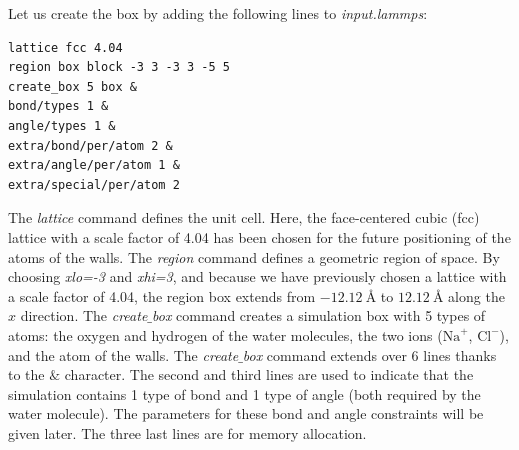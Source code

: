 \documentclass[9pt,tutorial]{livecoms}
\begin{document}
Let us create the box by adding the following lines to \textit{input.lammps}:
{\normalsize \begin{verbatim}
lattice fcc 4.04
region box block -3 3 -3 3 -5 5
create_box 5 box &
bond/types 1 &
angle/types 1 &
extra/bond/per/atom 2 &
extra/angle/per/atom 1 &
extra/special/per/atom 2
\end{verbatim}}
The \textit{lattice} command defines the unit cell. Here, the face-centered cubic (fcc) lattice with a scale factor of
4.04 has been chosen for the future positioning of the atoms of the walls. The \textit{region} command defines a geometric
region of space. By choosing \textit{xlo=-3} and \textit{xhi=3}, and because we have previously chosen a lattice with a scale
factor of 4.04, the region box extends from $-12.12~\text{\AA{}}$ to $12.12~\text{\AA{}}$ along the $x$ direction. The \textit{create$\_$box} command creates a simulation box with 5 types of atoms: the oxygen and hydrogen of the water molecules, the two ions ($\text{Na}^+$,
$\text{Cl}^-$), and the atom of the walls. The \textit{create$\_$box} command extends over 6 lines thanks to the $\&$ character. The second and third lines are used to indicate that the simulation contains 1 type of bond and 1 type of angle (both required by the water molecule). The parameters for these bond and angle constraints will be given later. The three last lines are for memory allocation.
\end{document}
